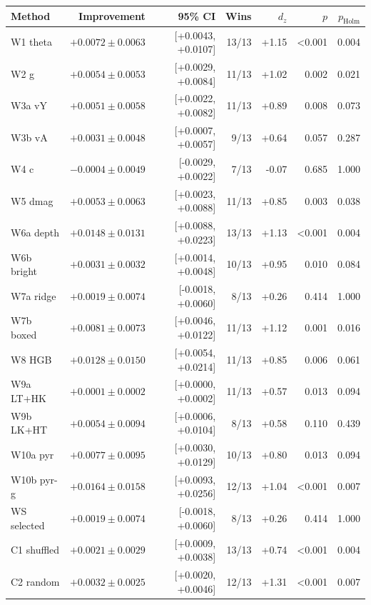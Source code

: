 \begin{tabular}{lrrrrrr}
\toprule
Method & Improvement & 95\% CI & Wins & $d_z$ & $p$ & $p_{\mathrm{Holm}}$ \\
\midrule
W1 theta & $+0.0072 \pm 0.0063$ & [+0.0043, +0.0107] & 13/13 & +1.15 & <0.001 & 0.004 \\
W2 g & $+0.0054 \pm 0.0053$ & [+0.0029, +0.0084] & 11/13 & +1.02 & 0.002 & 0.021 \\
W3a vY & $+0.0051 \pm 0.0058$ & [+0.0022, +0.0082] & 11/13 & +0.89 & 0.008 & 0.073 \\
W3b vA & $+0.0031 \pm 0.0048$ & [+0.0007, +0.0057] & 9/13 & +0.64 & 0.057 & 0.287 \\
W4 c & $-0.0004 \pm 0.0049$ & [-0.0029, +0.0022] & 7/13 & -0.07 & 0.685 & 1.000 \\
W5 dmag & $+0.0053 \pm 0.0063$ & [+0.0023, +0.0088] & 11/13 & +0.85 & 0.003 & 0.038 \\
W6a depth & $+0.0148 \pm 0.0131$ & [+0.0088, +0.0223] & 13/13 & +1.13 & <0.001 & 0.004 \\
W6b bright & $+0.0031 \pm 0.0032$ & [+0.0014, +0.0048] & 10/13 & +0.95 & 0.010 & 0.084 \\
W7a ridge & $+0.0019 \pm 0.0074$ & [-0.0018, +0.0060] & 8/13 & +0.26 & 0.414 & 1.000 \\
W7b boxed & $+0.0081 \pm 0.0073$ & [+0.0046, +0.0122] & 11/13 & +1.12 & 0.001 & 0.016 \\
W8 HGB & $+0.0128 \pm 0.0150$ & [+0.0054, +0.0214] & 11/13 & +0.85 & 0.006 & 0.061 \\
W9a LT+HK & $+0.0001 \pm 0.0002$ & [+0.0000, +0.0002] & 11/13 & +0.57 & 0.013 & 0.094 \\
W9b LK+HT & $+0.0054 \pm 0.0094$ & [+0.0006, +0.0104] & 8/13 & +0.58 & 0.110 & 0.439 \\
W10a pyr & $+0.0077 \pm 0.0095$ & [+0.0030, +0.0129] & 10/13 & +0.80 & 0.013 & 0.094 \\
W10b pyr-g & $+0.0164 \pm 0.0158$ & [+0.0093, +0.0256] & 12/13 & +1.04 & <0.001 & 0.007 \\
WS selected & $+0.0019 \pm 0.0074$ & [-0.0018, +0.0060] & 8/13 & +0.26 & 0.414 & 1.000 \\
C1 shuffled & $+0.0021 \pm 0.0029$ & [+0.0009, +0.0038] & 13/13 & +0.74 & <0.001 & 0.004 \\
C2 random & $+0.0032 \pm 0.0025$ & [+0.0020, +0.0046] & 12/13 & +1.31 & <0.001 & 0.007 \\
\bottomrule
\end{tabular}
